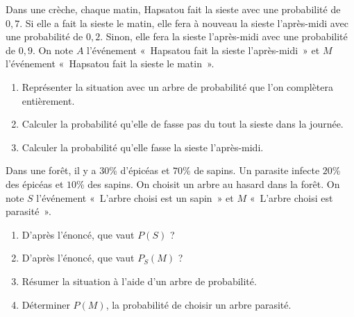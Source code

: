 \documentclass[11pt]{article}
\begin{document}
\begin{exo}
Dans une crèche, chaque matin, Hapsatou fait la sieste
avec une probabilité de $0,7$. Si elle a fait la sieste le matin, elle fera à
nouveau la sieste l'après-midi avec une probabilité de $0,2$. Sinon, elle fera
la sieste l'après-midi avec une probabilité de $0,9$. On note $A$ l'événement
«~Hapsatou fait la sieste l'après-midi~» et $M$ l'événement «~Hapsatou fait la
sieste le matin~».
\begin{enumerate}
  \item Représenter la situation avec un arbre de probabilité que l'on
    complètera entièrement.
  \item Calculer la probabilité qu'elle de fasse pas du tout la sieste dans la
    journée.
  \item Calculer la probabilité qu'elle fasse la sieste l'après-midi.
\end{enumerate}
\end{exo}

\begin{exo}
  Dans une forêt, il y a $30$\% d'épicéas et $70$\% de sapins. Un parasite infecte
$20$\% des épicéas et $10$\% des sapins. On
choisit un arbre au hasard dans la forêt. On note $S$ l'événement «~L'arbre
choisi est un sapin~» et $M$ «~L'arbre choisi est parasité~».
\begin{enumerate}
  \item D'après l'énoncé, que vaut $P(S)$ ?
  \item D'après l'énoncé, que vaut $P_S(M)$ ?
  \item Résumer la situation à l'aide d'un arbre de probabilité.
  \item Déterminer $P(M)$, la probabilité de choisir un arbre parasité.
\end{enumerate}
\end{exo}
\end{document}
